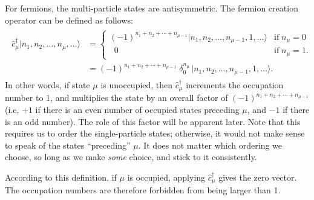 \documentclass[pra,12pt]{revtex4}
\begin{document}
For fermions, the multi-particle states are antisymmetric.  The
fermion creation operator can be defined as follows:
\begin{align}
  \begin{aligned}\hat{c}_\mu^\dagger |n_1, n_2, \dots, n_\mu,\dots\rangle &= \begin{cases}(-1)^{n_1 + n_2 + \cdots + n_{\mu-1}} |n_1, n_2, \dots, n_{\mu-1}, 1, \dots\rangle & \mathrm{if} \; n_\mu = 0 \\ \;\;0 & \mathrm{if}\; n_\mu = 1.
    \end{cases} \\&= (-1)^{n_1 + n_2 + \cdots + n_{\mu-1}}\; \delta^{n_\mu}_0\, \big|n_1, n_2, \dots, n_{\mu-1}, 1, \dots\big\rangle. \end{aligned}
\end{align}
In other words, if state $\mu$ is unoccupied, then
$\hat{c}_\mu^\dagger$ increments the occupation number to 1, and
multiplies the state by an overall factor of $(-1)^{n_1 + n_2 + \cdots
  + n_{\mu-1}}$ (i.e, $+1$ if there is an even number of occupied
states preceding $\mu$, and $-1$ if there is an odd number).  The role
of this factor will be apparent later.  Note that this requires us to
order the single-particle states; otherwise, it would not make sense
to speak of the states ``preceding'' $\mu$.  It does not matter which
ordering we choose, so long as we make \textit{some} choice, and stick
to it consistently.

According to this definition, if $\mu$ is occupied, applying
$\hat{c}_\mu^\dagger$ gives the zero vector.  The occupation numbers
are therefore forbidden from being larger than 1.
\end{document}
